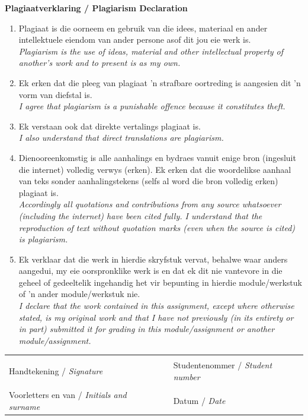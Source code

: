 \documentclass[11pt,a4paper]{article}
\begin{document}
	{\Large \bf Plagiaatverklaring / Plagiarism Declaration}
	\begin{enumerate}
		\item Plagiaat is die oorneem en gebruik van die idees, materiaal en ander intellektuele eiendom van ander persone asof dit jou eie werk is.\\
		\textit{Plagiarism is the use of ideas, material and other intellectual property of another's work and to present is as my own.}
		\item Ek erken dat die pleeg van plagiaat 'n strafbare oortreding is aangesien dit 'n vorm van diefstal is. \\
		\textit{I agree that plagiarism is a punishable offence because it constitutes theft.}
		\item Ek verstaan ook dat direkte vertalings plagiaat is.\\
		\textit{I also understand that direct translations are plagiarism.}
		\item Dienooreenkomstig is alle aanhalings en bydraes vanuit enige bron (ingesluit die internet) volledig verwys (erken). Ek erken dat die woordelikse aanhaal van teks sonder aanhalingstekens (selfs al word die bron volledig erken) plagiaat is.\\
		\textit{Accordingly all quotations and contributions from any source whatsoever (including the internet) have been cited fully. I understand that the reproduction of text without quotation marks (even when the source is cited) is plagiarism.}
		\item Ek verklaar dat die werk in hierdie skryfstuk vervat, behalwe waar anders aangedui, my eie oorspronklike werk is en dat ek dit nie vantevore in die geheel of gedeeltelik ingehandig het vir bepunting in hierdie module/werkstuk of 'n ander module/werkstuk nie.\\
		\textit{I declare that the work contained in this assignment, except where otherwise stated, is my original work and that I have not previously (in its entirety or in part) submitted it for grading in this module/assignment or another module/assignment.}
	\end{enumerate}
	\vspace{1cm}
	\begin{table}[ht]
		\begin{center}
			\begin{tabular*}{15.5cm}{@{\extracolsep{\fill}}lll}
				\makebox[8cm]{\hrulefill} & & \makebox[6cm]{\hrulefill}\\
				Handtekening / \textit{Signature} & & Studentenommer / \textit{Student number}\\[1cm]
				\makebox[8cm]{\hrulefill} & & \makebox[6cm]{\hrulefill}\\ 
				Voorletters en van / \textit{Initials and surname} & & Datum / \textit{Date} \\
			\end{tabular*}
		\end{center}
	\end{table}
\end{document}

